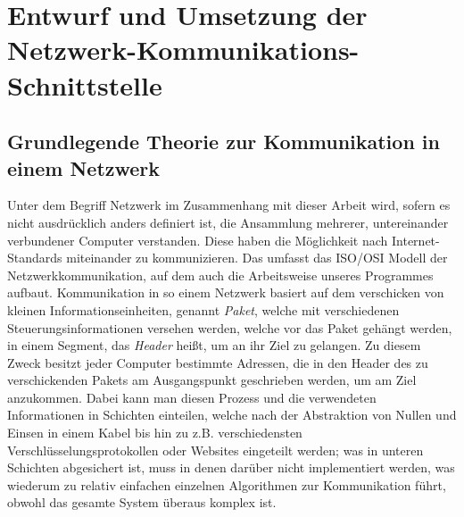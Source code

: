 \documentclass[12pt, a4paper]{scrartcl}
\begin{document}
\section{Entwurf und Umsetzung der Netzwerk-Kommunikations-Schnittstelle}
\subsection{Grundlegende Theorie zur Kommunikation in einem Netzwerk}
Unter dem Begriff Netzwerk im Zusammenhang mit dieser Arbeit wird, sofern es nicht ausdrücklich anders definiert ist, die Ansammlung mehrerer, untereinander verbundener Computer verstanden.
Diese haben die Möglichkeit nach Internet-Standards miteinander zu kommunizieren.
Das umfasst das ISO/OSI Modell der Netzwerkkommunikation, auf dem auch die Arbeitsweise unseres Programmes aufbaut.
Kommunikation in so einem Netzwerk basiert auf dem verschicken von kleinen Informationseinheiten, genannt \textit{Paket}, welche mit verschiedenen Steuerungsinformationen versehen werden, welche vor das Paket gehängt werden, in einem Segment, das \textit{Header} heißt, um an ihr Ziel zu gelangen.
Zu diesem Zweck besitzt jeder Computer bestimmte Adressen, die in den Header des zu verschickenden Pakets am Ausgangspunkt geschrieben werden, um am Ziel anzukommen.
Dabei kann man diesen Prozess und die verwendeten Informationen in Schichten einteilen, welche nach der Abstraktion von Nullen und Einsen in einem Kabel bis hin zu z.B. verschiedensten Verschlüsselungsprotokollen oder Websites eingeteilt werden; was in unteren Schichten abgesichert ist, muss in denen darüber nicht implementiert werden, was wiederum zu relativ einfachen einzelnen Algorithmen zur Kommunikation führt, obwohl das gesamte System überaus komplex ist.
\end{document}
